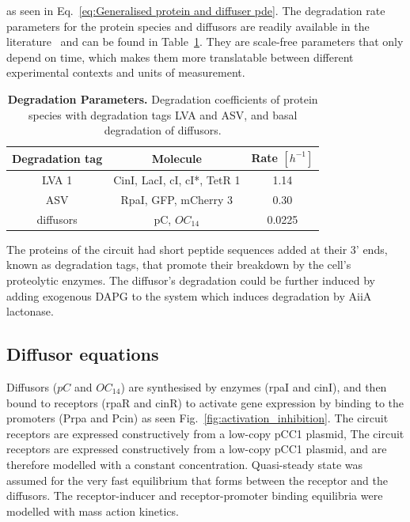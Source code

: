 as seen in Eq.~\ref{eq:Generalised protein and diffuser pde}.
The degradation rate parameters for the protein species and diffusors are readily available in the literature~\parencite{Andersen1998, kaufmann2005revisiting}
and can be found in Table~\ref{table:degradation table}.
They are scale-free parameters that only depend on time,
which makes them more translatable between different experimental contexts and units of measurement.



\begin{table}[H]
    \centering
    \begin{tabular}{|c|c|c|}
        \hline
        \textbf{Degradation tag} & \textbf{Molecule} & \textbf{Rate $[h^{-1}]$} \\
        \hline
        LVA 1 & CinI, LacI, cI, cI*, TetR 1 & 1.14 \\
        \hline
        ASV & RpaI, GFP, mCherry 3 & 0.30 \\
        \hline
        diffusors & pC, $OC_{14}$ & 0.0225 \\
        \hline
    \end{tabular}
    \caption{\textbf{Degradation Parameters.} Degradation coefficients of protein species with degradation tags LVA and ASV, and basal degradation of diffusors.}
    \label{table:degradation table}
\end{table}

The proteins of the circuit had short peptide sequences added at their 3’ ends,
known as degradation tags, that promote their breakdown by the cell’s proteolytic enzymes.
The diffusor's degradation could be further induced
by adding exogenous DAPG to the system which induces degradation by AiiA lactonase.

\subsection{Diffusor equations}
Diffusors ($pC$ and $OC_{14}$) are synthesised by enzymes (rpaI and cinI), and then bound to receptors (rpaR and cinR) to activate gene expression by binding to the promoters (Prpa and Pcin)
 as seen Fig.~\ref{fig:activation_inhibition}.
The circuit receptors are expressed constructively from a low-copy pCC1 plasmid,
The circuit receptors are expressed constructively from a low-copy pCC1 plasmid,
and are therefore modelled with a constant concentration.
Quasi-steady state was assumed for the very fast equilibrium that forms between the receptor and the diffusors.
The receptor-inducer and receptor-promoter binding equilibria were modelled with mass action kinetics.

